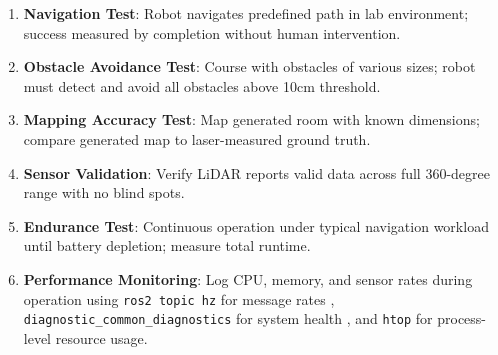 \begin{enumerate}
    \item \textbf{Navigation Test}: Robot navigates predefined path in lab environment; success measured by completion without human intervention.

    \item \textbf{Obstacle Avoidance Test}: Course with obstacles of various sizes; robot must detect and avoid all obstacles above 10cm threshold.

    \item \textbf{Mapping Accuracy Test}: Map generated room with known dimensions; compare generated map to laser-measured ground truth.

    \item \textbf{Sensor Validation}: Verify LiDAR reports valid data across full 360-degree range with no blind spots.

    \item \textbf{Endurance Test}: Continuous operation under typical navigation workload until battery depletion; measure total runtime.

    \item \textbf{Performance Monitoring}: Log CPU, memory, and sensor rates during operation using \texttt{ros2 topic hz} for message rates \parencite{ros2_documentation}, \texttt{diagnostic\_common\_diagnostics} for system health \parencite{ros2_diagnostic_common}, and \texttt{htop} for process-level resource usage.
\end{enumerate}
